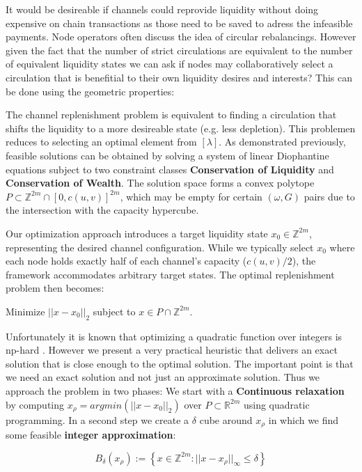 \documentclass[10pt,twocolumn]{article}
\begin{document}
It would be desireable if channels could reprovide liquidity without doing expensive on chain transactions as those need to be saved to adress the infeasible payments.
Node operators often discuss the idea of circular rebalancings. However given the fact that the number of strict circulations are equivalent to the number of equivalent liquidity states we can ask if nodes may collaboratively select a circulation that is benefitial to their own liquidity desires and interests?
This can be done using the geometric properties:


The channel replenishment problem is equivalent to finding a circulation that shifts the liquidity to a more desireable state (e.g. less depletion). This problemen reduces to selecting an optimal element from $[\lambda]$. As demonstrated previously, feasible solutions can be obtained by solving a system of linear Diophantine equations subject to two constraint classes \textbf{Conservation of Liquidity} and \textbf{Conservation of Wealth}.
The solution space forms a convex polytope $P \subset \mathbb{Z}^{2m} \cap [0, c(u,v)]^{2m}$, which may be empty for certain $(\omega, G)$ pairs due to the intersection with the capacity hypercube.

Our optimization approach introduces a target liquidity state $x_0 \in \mathbb{Z}^{2m}$, representing the desired channel configuration. While we typically select $x_0$ where each node holds exactly half of each channel's capacity ($c(u,v)/2$), the framework accommodates arbitrary target states. The optimal replenishment problem then becomes:

Minimize $||x - x_0||_2$ subject to $x \in P \cap \mathbb{Z}^{2m}$.

Unfortunately it is known that optimizing a quadratic function over integers is np-hard \cite{delpia2014mixedintegerquadraticprogrammingnp}. However we present a very practical heuristic that delivers an exact solution that is close enough to the optimal solution. The important point is that we need an exact solution and not just an approximate solution. Thus we approach the problem in two phases: We start with a \textbf{Continuous relaxation} by computing $x_{\rho} = argmin\left(||x - x_0||_2\right)$ over $P \subset \mathbb{R}^{2m}$ using quadratic programming. In a second step we create a $\delta$ cube around $x_{\rho}$ in which we find some feasible \textbf{integer approximation}:

\[B_\delta(x_\rho) := \left\{x \in \mathbb{Z}^{2m} : ||x - x_\rho||_\infty \leq \delta\right\}\]
\end{document}
